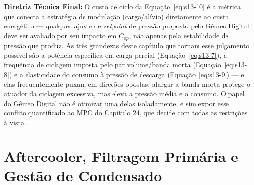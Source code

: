 \documentclass[12pt,a4paper]{article}
\numberwithin{equation}{section}
\numberwithin{table}{section}
\numberwithin{figure}{section}
\begin{document}
	\textbf{Diretriz Técnica Final:} O custo de ciclo da Equação~\eqref{eq:s13-10} é a métrica que conecta a estratégia de modulação (carga/alívio) diretamente ao custo energético — qualquer ajuste de \textit{setpoint} de pressão proposto pelo Gêmeo Digital deve ser avaliado por seu impacto em $C_{op}$, não apenas pela estabilidade de pressão que produz. As três grandezas deste capítulo que tornam esse julgamento possível são a potência específica em carga parcial (Equação~\eqref{eq:s13-7}), a frequência de ciclagem imposta pelo par volume/banda morta (Equação~\eqref{eq:s13-8}) e a elasticidade do consumo à pressão de descarga (Equação~\eqref{eq:s13-9}) — e elas frequentemente puxam em direções opostas: alargar a banda morta protege o atuador da ciclagem excessiva, mas eleva a pressão média e o consumo. O papel do Gêmeo Digital não é otimizar uma delas isoladamente, e sim expor esse conflito quantificado ao MPC do Capítulo 24, que decide com todas as restrições à vista.

	\clearpage
	\section{Aftercooler, Filtragem Primária e Gestão de Condensado}

\end{document}
